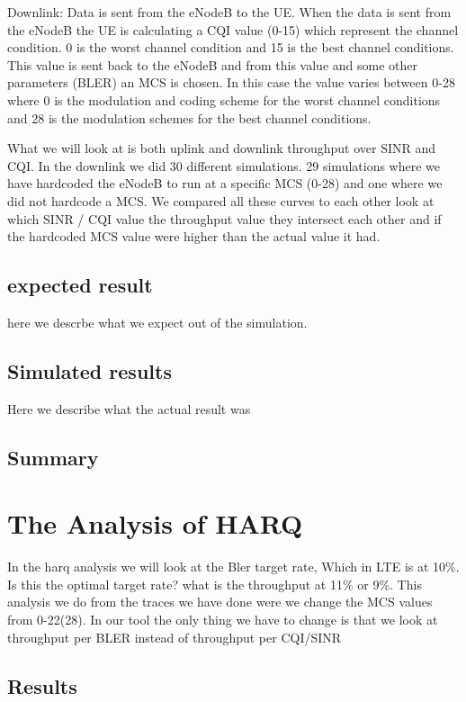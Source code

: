 \documentclass[cropmarks, frame, english]{idamasterthesis}
\begin{document}
Downlink: \newline
Data is sent from the eNodeB to the UE. When the data is sent from the eNodeB the UE is calculating a CQI value (0-15) which represent the channel condition. 0 is the worst channel condition and 15 is the best channel conditions. This value is sent back to the eNodeB and from this value and some other parameters (BLER) an MCS is chosen. In this case the value varies between 0-28 where 0 is the modulation and coding scheme for the worst channel conditions and 28 is the modulation schemes for the best channel conditions.

What we will look at is both uplink and downlink throughput over SINR and CQI. In the downlink we did 30 different simulations. 29 simulations where we have hardcoded the eNodeB to run at a specific MCS (0-28) and one where we did not hardcode a MCS. We compared all these curves to each other look at which SINR / CQI value  the throughput value they intersect each other and if the hardcoded MCS value were higher than the actual value it had. 

\subsection{expected result}
here we descrbe what we expect out of the simulation.

\subsection{Simulated results}
Here we describe what the actual result was

\subsection{Summary}


\section{The Analysis of HARQ}
In the harq analysis we will look at the Bler target rate, Which in LTE is at 10\%. Is this the optimal target rate? what is the throughput at 11\% or 9\%. This analysis we do from the traces we have done were we change the MCS values from 0-22(28). In our tool the only thing we have to change is that we look at throughput per BLER instead of throughput per CQI/SINR

\subsection{Results}
\end{document}
